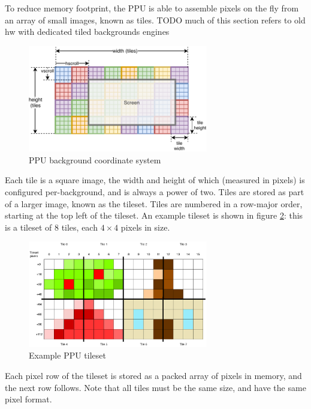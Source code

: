 To reduce memory footprint, the PPU is able to assemble pixels on the fly from an array of small images, known as tiles. TODO much of this section refers to old hw with dedicated tiled backgrounds engines

\begin{figure}[H]
\centering
\caption{PPU background coordinate system}
\label{diagram:ppu_bg_coords}
\includegraphics[width=0.7\textwidth]{diagrams/ppu_bg_coords.pdf}
\end{figure}

Each tile is a square image, the width and height of which (measured in pixels) is configured per-background, and is always a power of two. Tiles are stored as part of a larger image, known as the tileset. Tiles are numbered in a row-major order, starting at the top left of the tileset. An example tileset is shown in figure \ref{diagram:ppu_tileset}: this is a tileset of 8 tiles, each $4\times 4$ pixels in size.

\begin{figure}[H]
\centering
\caption{Example PPU tileset}
\label{diagram:ppu_tileset}
\includegraphics[width=0.7\textwidth]{diagrams/ppu_tileset.pdf}
\end{figure}

Each pixel row of the tileset is stored as a packed array of pixels in memory, and the next row follows. Note that all tiles must be the same size, and have the same pixel format.

